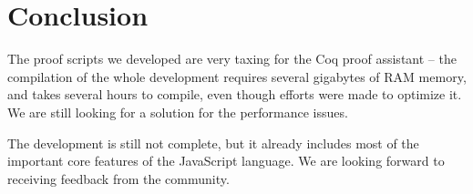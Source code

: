 \documentclass{llncs}
\newcommand{\mmi}[1]{\todo[color=aliceblue,inline]{#1}}
\begin{document}
\mmi{TODO}

\section{Conclusion}

The proof scripts we developed are very taxing for the Coq
proof assistant -- the compilation of the whole development
requires several gigabytes of RAM memory, and takes several
hours to compile, even though efforts were made to optimize it.
We are still looking for a solution for the performance issues.

The development is still not complete, but it already
includes most of the important core features of the
JavaScript language. We are looking forward to receiving
feedback from the community.

\printbibliography
\end{document}
